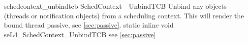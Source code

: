 %
%
%
%

\apidoc
{schedcontext_unbindtcb}
{SchedContext - UnbindTCB}
{Unbind any objects (threads or notification objects) from a scheduling context. This will render the bound thread passive, see \autoref{sec:passive}.}
{static inline void seL4\_SchedContext\_UnbindTCB}
{
}
{\errorenumdesc}
{see \autoref{sec:passive}}
